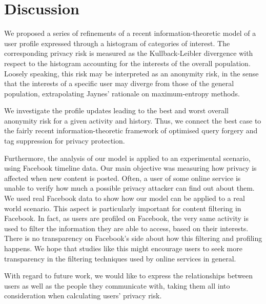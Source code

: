 \section{Discussion}
\noindent
We proposed a series of refinements of a recent information-theoretic model of a user profile expressed through a histogram of categories of interest. The corresponding privacy risk is measured as the Kullback-Leibler divergence with respect to the histogram accounting for the interests of the overall population. Loosely speaking, this risk may be interpreted as an anonymity risk, in the sense that the interests of a specific user may diverge from those of the general population, extrapolating Jaynes' rationale on maximum-entropy methods.

We investigate the profile updates leading to the best and worst overall anonymity risk for a given activity and history. Thus, we connect the best case to the fairly recent information-theoretic framework of optimised query forgery and tag suppression for privacy protection.

Furthermore, the analysis of our model is applied to an experimental scenario, using Facebook timeline data. Our main objective was measuring how privacy is affected when new content is posted. Often, a user of some online service is unable to verify how much a possible privacy attacker can find out about them. We used real Facebook data to show how our model can be applied to a real world scenario. This aspect is particularly important for content filtering in Facebook. In fact, as users are profiled on Facebook, the very same activity is used to filter the information they are able to access, based on their interests. There is no transparency on Facebook's side about how this filtering and profiling happens. We hope that studies like this might encourage users to seek more transparency in the filtering techniques used by online services in general.

With regard to future work, we would like to express the relationships between users as well as the people they communicate with, taking them all into consideration when calculating users' privacy risk.
